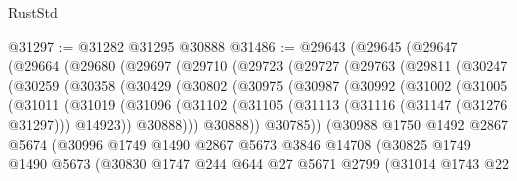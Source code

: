 \begin{lexlean}{RustStd}
\begin{coremodule}
@31297 := @31282 @31295 @30888
@31486 := @29643
    (@29645
      (@29647
        (@29664
          (@29680
            (@29697
              (@29710
                (@29723
                  (@29727
                    (@29763
                      (@29811
                        (@30247
                          (@30259
                            (@30358
                              (@30429
                                (@30802
                                  (@30975
                                    (@30987
                                      (@30992
                                        (@31002
                                          (@31005
                                            (@31011
                                              (@31019
                                                (@31096
                                                  (@31102
                                                    (@31105
                                                      (@31113
                                                        (@31116 (@31147 (@31276 @31297)))
                                                        @14923))
                                                    @30888)))
                                              @30888))
                                          @30785))
                                      (@30988
                                        @1750
                                        @1492
                                        @2867
                                        @5674
                                        (@30996
                                          @1749
                                          @1490
                                          @2867
                                          @5673
                                          @3846
                                          @14708
                                          (@30825
                                            @1749
                                            @1490
                                            @5673
                                            (@30830
                                              @1747
                                              @244
                                              @644
                                              @27
                                              @5671
                                              @2799
                                              (@31014
                                                @1743
                                                @22

\end{coremodule}
\end{lexlean}
